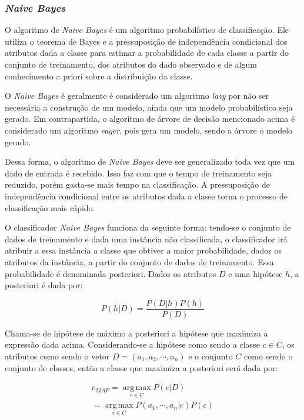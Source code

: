 \documentclass{article}
\begin{document}
\subsubsection{{\b \it Naive Bayes}}

O algoritmo de {\it Naive Bayes} é um algoritmo probabilístico de classificação. Ele utiliza o teorema de Bayes e a pressuposição de independência condicional dos atributos dada a classe para estimar a probabilidade de cada classe a partir do conjunto de treinamento, dos atributos do dado observado e de algum conhecimento a priori sobre a distribuição da classe.

O {\it Naive Bayes} é geralmente é considerado um algoritmo {\it lazy} por não ser necessária a construção de um modelo, ainda que um modelo probabilístico seja gerado. Em contrapartida, o algoritmo de árvore de decisão mencionado acima é considerado um algoritmo {\it eager}, pois gera um modelo, sendo a árvore o modelo gerado.

Dessa forma, o algoritmo de {\it Naive Bayes} deve ser generalizado toda vez que um dado de entrada é recebido. Isso faz com que o tempo de treinamento seja reduzido, porém gasta-se mais tempo na classificação. A pressuposição de independência condicional entre os atributos dada a classe torna o processo de classificação mais rápido.

O classificador {\it Naive Bayes} funciona da seguinte forma: tendo-se o conjunto de dados de treinamento e dada uma instância não classificada, o classificador irá atribuir a essa instância a classe que obtiver a maior probabilidade, dados os atributos da instância, a partir do conjunto de dados de treinamento. Essa probabilidade é denominada posteriori. Dados os atributos $D$ e uma hipótese $h$, a posteriori é dada por:

\begin{equation}
P(h|D) = \frac{P(D|h) P(h)}{P(D)}
\end{equation}

Chama-se de hipótese de máximo a posteriori a hipótese que maximiza a expressão dada acima. Considerando-se a hipótese como sendo a classe $c \in C$, os atributos como sendo o vetor $D = (a_1,a_2,\cdots,a_n)$ e o conjunto $C$ como sendo o conjunto de classes, então a classe que maximiza a posteriori será dada por:

\begin{multline}
c_{MAP} = \operatorname*{arg\,max}_{c \in C} P(c|D) \\
= \operatorname*{arg\,max}_{c \in C} P(a_1,\cdots,a_n|c) P(c)
\end{multline}
\end{document}
